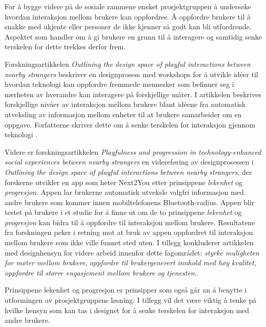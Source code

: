 For å bygge videre på de sosiale rammene ønsket prosjektgruppen å undersøke hvordan interaksjon mellom brukere kan oppfordres. Å oppfordre brukere til å snakke med ukjente eller personer de ikke kjenner så godt kan bli utfordrende. Aspektet som handler om å gi brukere en grunn til å interagere og samtidig senke terskelen for dette trekkes derfor frem.

Forskningsartikkelen {\em Outlining the design space of playful interactions between nearby strangers}  beskriver en designprosess med workshops for å utvikle idéer til hvordan teknologi kan oppfordre fremmede mennesker som befinner seg i nærheten av hverandre kan interagere på forskjellige måter. I artikkelen beskrives forskjellige nivåer av interaksjon mellom brukere blant idéene fra automatisk utveksling av informasjon mellom enheter til at brukere samarbeider om en oppgave. Forfatterne skriver dette om å senke terskelen for interaksjon gjennom teknologi  \cite{NEARBY:5:AM16}. 

Videre er forskningsartikkelen {\em Playfulness and progression in technology-enhanced social experiences between nearby strangers}  en videreføring av designprosessen i {\em Outlining the design space of playful interactions between nearby strangers}, der forskerne utvikler en app som heter Next2You etter prinsippene {\em lekenhet} og {\em progresjon}. Appen lar brukerne automatisk utveksle valgfri informasjon med andre brukere som kommer innen mobiltelefonens Bluetooth-radius. Appen blir testet på brukere i et studie for å finne ut om de to prinsippene {\em lekenhet} og {\em progresjon} kan bidra til å oppfordre til interaksjon mellom brukere. Resultatene fra forskningen peker i retning mot at bruk av appen oppfordret til interaksjon mellom brukere som ikke ville funnet sted uten. I tillegg konkluderer artikkelen med designhensyn for videre arbeid innenfor dette fagområdet: {\em styrke muligheten for møter mellom brukere}, {\em oppfordre til brukergenerert innhold med høy kvalitet}, {\em oppfordre til større engasjement mellom brukere og tjenesten}.\cite{PLAYFUL:6:NORDICHI18}.

Prinsippene lekenhet og progresjon er prinsipper som også går an å benytte i utformingen av prosjektgruppens løsning. I tillegg vil det være viktig å tenke på hvilke hensyn som kan tas i designet for å senke terskelen for interaksjon med andre brukere. 

